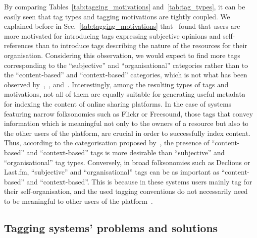 By comparing Tables~\ref{tab:tagging_motivations} and~\ref{tab:tag_types}, it can be easily seen that tag types and tagging motivations are tightly coupled.
We explained before in Sec.~\ref{tab:tagging_motivations} that~\cite{Ames2007} found that users are more motivated for introducing tags expressing subjective opinions and self-references than to introduce tags describing the nature of the resources for their organisation. Considering this observation, we would expect to find more tags corresponding to the ``subjective'' and ``organisational'' categories rather than to the ``content-based'' and ``context-based'' categories, which is not what has been observed by~\cite{Simons2008},~\cite{Bischoff2008}, and~\cite{cantador2010}.
Interestingly, among the resulting types of tags and motivations, not all of them are equally suitable for generating useful metadata for indexing the content of online sharing platforms. In the case of systems featuring narrow folksonomies such as Flickr or Freesound, those tags that convey information which is meaningful not only to the owners of a resource but also to the other users of the platform, are crucial in order to successfully index content. Thus, according to the categorisation proposed by~\cite{cantador2010}, the presence of ``content-based'' and ``context-based'' tags is more desirable than ``subjective'' and ``organisational'' tag types. Conversely, in broad folksonomies such as Declious or Last.fm, ``subjective'' and ``organisational'' tags can be as important as ``content-based'' and ``context-based''. This is because in these systems users mainly tag for their self-organisation, and the used tagging conventions do not necessarily need to be meaningful to other users of the platform~\citep{DeMeo2013}.


\subsection{Tagging systems' problems and solutions}
\label{soa:tagging_problems}


